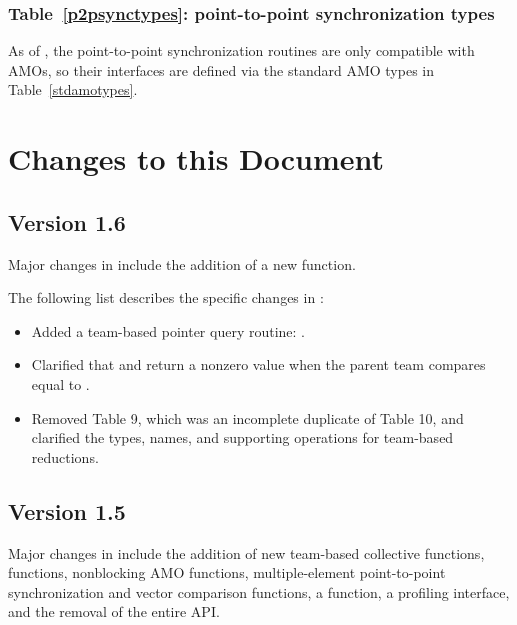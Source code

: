 \subsection{Table~\ref{p2psynctypes}: point-to-point synchronization types}
\label{dep:p2p_sync_types}
As of , the point-to-point synchronization routines are only
compatible with \acp{AMO}, so their interfaces are defined via the
standard \ac{AMO} types in Table~\ref{stdamotypes}.




\chapter{Changes to this Document}\label{sec:changelog}

\section{Version 1.6}
Major changes in \openshmem[1.6] include the addition of a new
 function.

The following list describes the specific changes in \openshmem[1.6]:
\begin{itemize}
%
\item Added a team-based pointer query routine:
  .
%
%
\item Clarified that  and
     return a nonzero value when the parent
    team compares equal to .
%
%
\item Removed \openshmem[1.5] Table 9, which was an incomplete duplicate of
    \openshmem[1.5] Table 10, and clarified the types, names, and supporting
    operations for team-based reductions.
%
\end{itemize}

\section{Version 1.5}
Major changes in \openshmem[1.5] include the addition of new team-based
collective functions,  functions, nonblocking \ac{AMO}
functions, multiple-element point-to-point synchronization and vector
comparison functions, a  function, a profiling
interface, and the removal of the entire \Fortran \ac{API}.


